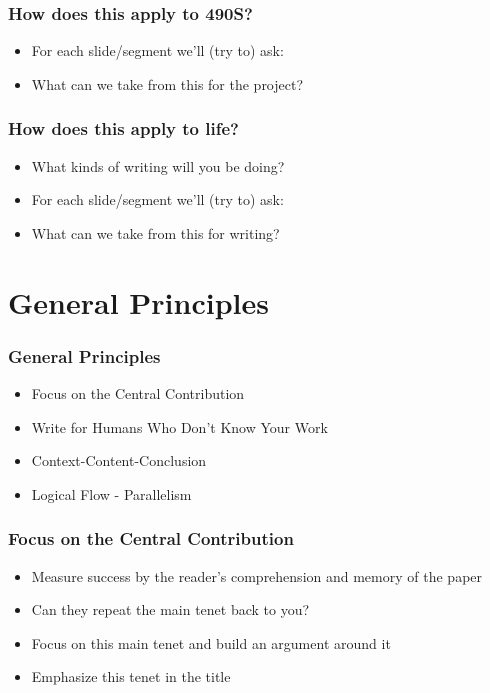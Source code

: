 \documentclass[14pt,handout]{beamer}
\begin{document}
\begin{frame}
\frametitle{How does this apply to 490S?}
\begin{itemize}
	\item<+-> For each slide/segment we'll (try to) ask:
	\item<+-> What can we take from this for the project?
\end{itemize}
\end{frame}

\begin{frame}
\frametitle{How does this apply to life?}
\begin{itemize}
	\item<+-> What kinds of writing will you be doing?
	\item<+-> For each slide/segment we'll (try to) ask:
	\item<+-> What can we take from this for writing?
\end{itemize}
\end{frame}

\section{General Principles}

\begin{frame}
\frametitle{General Principles}
\begin{itemize}
	\item<+-> Focus on the Central Contribution
	\item<+-> Write for Humans Who Don't Know Your Work
	\item<+-> Context-Content-Conclusion
	\item<+-> Logical Flow - Parallelism
\end{itemize}
\end{frame}

\begin{frame}
\frametitle{Focus on the Central Contribution}
\begin{itemize}
	\item<+-> Measure success by the reader's comprehension and memory of the paper
	\item<+-> Can they repeat the main tenet back to you?
	\item<+-> Focus on this main tenet and build an argument around it
	\item<+-> Emphasize this tenet in the title
\end{itemize}
\end{frame}
\end{document}
